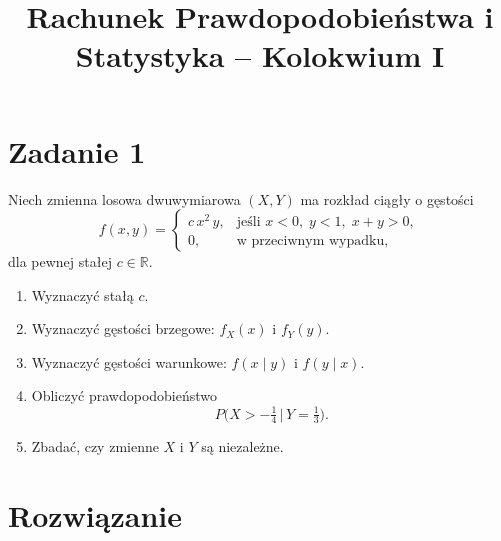 \documentclass[polish, 8pt]{article}
\title{Rachunek Prawdopodobieństwa i Statystyka -- Kolokwium I}
\author{}
\date{}
\begin{document}
\maketitle

\section*{Zadanie 1}
Niech zmienna losowa dwuwymiarowa \((X, Y)\) ma rozkład ciągły o gęstości
\[
f(x, y) =
\begin{cases}
    c \, x^2 \, y, &\text{jeśli } x<0,\; y<1,\; x+y>0,\\
    0, &\text{w przeciwnym wypadku},
\end{cases}
\]
dla pewnej stałej \(c \in \mathbb{R}\).
\begin{enumerate}
    \item Wyznaczyć stałą \(c\).
    \item Wyznaczyć gęstości brzegowe: \(f_X(x)\) i \(f_Y(y)\).
    \item Wyznaczyć gęstości warunkowe: \(f(x\mid y)\) i \(f(y\mid x)\).
    \item Obliczyć prawdopodobieństwo
    \[
    P\!\bigl(X > -\tfrac{1}{4} \,\big\vert\, Y=\tfrac{1}{3}\bigr).
    \]
    \item Zbadać, czy zmienne \(X\) i \(Y\) są niezależne.
\end{enumerate}

\section*{Rozwiązanie}
\end{document}
